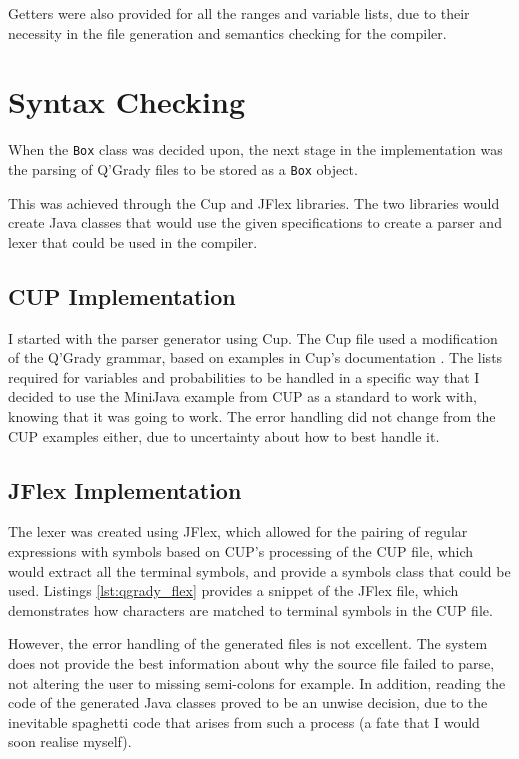 \documentclass[report.tex]{subfiles}
\begin{document}
Getters were also provided for all the ranges and variable lists, due to their
necessity in the file generation and semantics checking for the compiler.

\section{Syntax Checking} %
\label{sec:syntax_checking}
When the \texttt{Box} class was decided upon, the next stage in the
implementation was the parsing of Q'Grady files to be stored as a \texttt{Box}
object.

This was achieved through the Cup and JFlex libraries. The two libraries would
create Java classes that would use the given specifications to create a parser
and lexer that could be used in the compiler.

\subsection{CUP Implementation} %
\label{sub:cup_impl}
I started with the parser generator using Cup. The Cup file used a modification
of the Q'Grady grammar, based on examples in Cup's documentation 
\cite{cup_example}. The lists required for variables and probabilities to be
handled in a specific way that I decided to use the MiniJava example from CUP
as a standard to work with, knowing that it was going to work. The error
handling did not change from the CUP examples either, due to uncertainty about
how to best handle it.

\subsection{JFlex Implementation} %
\label{sub:jflex_impl}
The lexer was created using JFlex, which allowed for the pairing of regular
expressions with symbols based on CUP's processing of the CUP file, which would
extract all the terminal symbols, and provide a symbols class that could be
used. Listings \ref{lst:qgrady_flex} provides a snippet of the JFlex file, which
demonstrates how characters are matched to terminal symbols in the CUP file.

 


However, the error handling of the generated files is not excellent. The system
does not provide the best information about why the source file failed to parse,
not altering the user to missing semi-colons for example. In addition, reading
the code of the generated Java classes proved to be an unwise decision, due to
the inevitable spaghetti code that arises from such a process (a fate that I
would soon realise myself).
\end{document}
